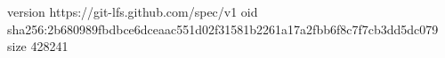 version https://git-lfs.github.com/spec/v1
oid sha256:2b680989fbdbce6dceaac551d02f31581b2261a17a2fbb6f8c7f7cb3dd5dc079
size 428241
